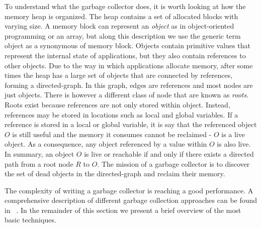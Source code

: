 To understand what the garbage collector does, it is worth looking at how the memory heap is organized.
The heap contains a set of allocated blocks with varying size.
A memory block can represent an \textit{object} as in object-oriented programming or an array, but along this description we use the generic term object as a synonymous of memory block. 
Objects contain primitive values that represent the internal state of applications, but they also contain references to other objects.
Due to the way in which applications allocate memory, after some times the heap has a large set of objects that are connected by references, forming a directed-graph.
In this graph, edges are references and most nodes are just objects.
There is however a different class of node that are known as \textit{roots}.
Roots exist because references are not only stored within object.
Instead, references may be stored in locations such as local and global variables.
If a reference is stored in a local or global variable, it is say that the referenced object $O$ is still useful and the memory it consumes cannot be reclaimed - $O$ is a live object.
As a consequence, any object referenced by a value within $O$ is also live.
In summary, an object $O$ is live or reachable if and only if there exists a directed path from a root node $R$ to $O$.
The mission of a garbage collector is to discover the set of dead objects in the directed-graph and reclaim their memory.

The complexity of writing a garbage collector is reaching a good performance.
A comprehensive description of different garbage collection approaches can be found in ~\cite{Richard2012}.
In the remainder of this section we present a brief overview of the most basic techniques.

